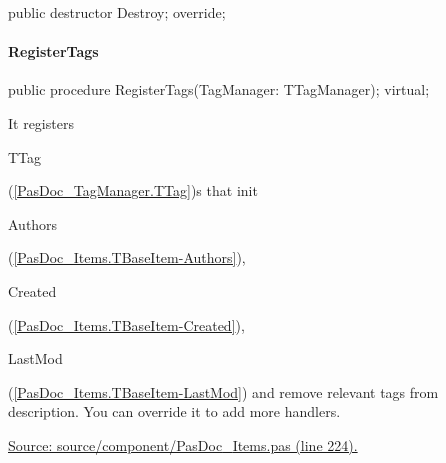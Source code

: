 \documentclass{report}
\newif\ifpdf
\begin{document}
\label{PasDoc_Items.TBaseItem-Destroy}
\begin{list}{}{
\setlength{\itemindent}{0cm}
\setlength{\listparindent}{0cm}
\setlength{\leftmargin}{\evensidemargin}
\addtolength{\leftmargin}{\tmplength}
\settowidth{\labelsep}{X}
\addtolength{\leftmargin}{\labelsep}
\setlength{\labelwidth}{\tmplength}
}
\item[\textbf{Declaration}\hfill]
\ifpdf
\begin{flushleft}
\fi
\begin{ttfamily}
public destructor Destroy; override;\end{ttfamily}

\ifpdf
\end{flushleft}
\fi

\end{list}
\paragraph*{RegisterTags}\hspace*{\fill}

\label{PasDoc_Items.TBaseItem-RegisterTags}
\begin{list}{}{
\setlength{\itemindent}{0cm}
\setlength{\listparindent}{0cm}
\setlength{\leftmargin}{\evensidemargin}
\addtolength{\leftmargin}{\tmplength}
\settowidth{\labelsep}{X}
\addtolength{\leftmargin}{\labelsep}
\setlength{\labelwidth}{\tmplength}
}
\item[\textbf{Declaration}\hfill]
\ifpdf
\begin{flushleft}
\fi
\begin{ttfamily}
public procedure RegisterTags(TagManager: TTagManager); virtual;\end{ttfamily}

\ifpdf
\end{flushleft}
\fi

\par
\item[\textbf{Description}]
It registers \begin{ttfamily}TTag\end{ttfamily}(\ref{PasDoc_TagManager.TTag})s that init \begin{ttfamily}Authors\end{ttfamily}(\ref{PasDoc_Items.TBaseItem-Authors}), \begin{ttfamily}Created\end{ttfamily}(\ref{PasDoc_Items.TBaseItem-Created}), \begin{ttfamily}LastMod\end{ttfamily}(\ref{PasDoc_Items.TBaseItem-LastMod}) and remove relevant tags from description. You can override it to add more handlers.\par
\href{https://github.com/pasdoc/pasdoc/blob/master/source/component/PasDoc_Items.pas#L224}{Source: source/component/PasDoc{\_}Items.pas (line 224).}

\end{list}
\end{document}
